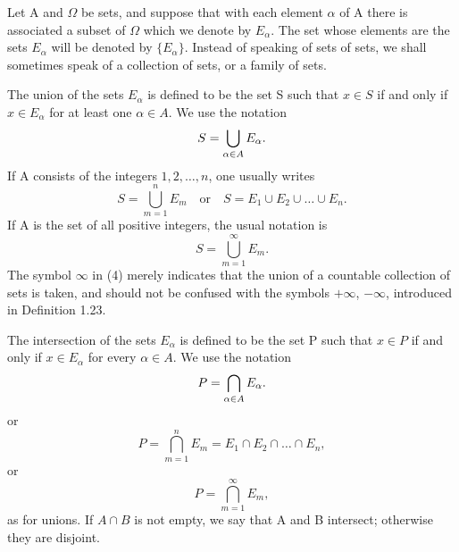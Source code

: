 \begin{definition} %
  \label{def:chap2:set_collections}
  Let A and $\Omega$ be sets, and suppose that with each element
  $\alpha$ of A there is associated a subset of $\Omega$ which we
  denote by $E_\alpha$.
  The set whose elements are the sets $E_\alpha$ will be denoted by
  $\{E_\alpha\}$. Instead of speaking of sets of sets, we shall
  sometimes speak of a collection of sets, or a family of sets.

  The union of the sets $E_\alpha$ is defined to be the set S such
  that $x \in S$ if and only if $x \in E_\alpha$ for at least one
  $\alpha \in A$. We use the notation
  \begin{equation} \label{eq:chap2:union_def}
    S = \bigcup_{\alpha \in A} E_\alpha.
  \end{equation}
  If A consists of the integers $1, 2, \dots, n$, one usually writes
  \begin{equation} \label{eq:chap2:finite_union}
    S = \bigcup_{m=1}^{n} E_m \quad \text{or} \quad S = E_1 \cup E_2
    \cup \dots \cup E_n.
  \end{equation}
  If A is the set of all positive integers, the usual notation is
  \begin{equation} \label{eq:chap2:countable_union}
    S = \bigcup_{m=1}^{\infty} E_m.
  \end{equation}
  The symbol $\infty$ in (4) merely indicates that the union of a
  countable collection of sets is taken, and should not be confused
  with the symbols $+\infty$, $-\infty$, introduced in Definition 1.23.

  The intersection of the sets $E_\alpha$ is defined to be the set P
  such that $x \in P$ if and only if $x \in E_\alpha$ for every
  $\alpha \in A$. We use the notation
  \begin{equation} \label{eq:chap2:intersect_def}
    P = \bigcap_{\alpha \in A} E_\alpha.
  \end{equation}
  or
  \begin{equation} \label{eq:chap2:finite_intersect}
    P = \bigcap_{m=1}^{n} E_m = E_1 \cap E_2 \cap \dots \cap E_n,
  \end{equation}
  or
  \begin{equation} \label{eq:chap2:countable_intersect}
    P = \bigcap_{m=1}^{\infty} E_m,
  \end{equation}
  as for unions. If $A \cap B$ is not empty, we say that A and B
  intersect; otherwise they are disjoint.
\end{definition}

